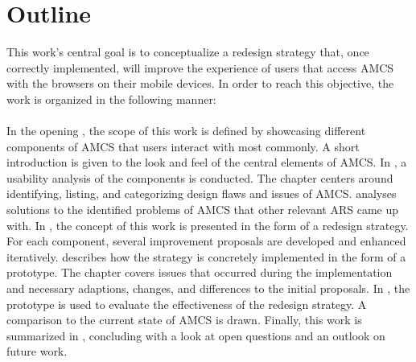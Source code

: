 \section{Outline}
\label{section:intro:objective}
This work's central goal is to conceptualize a redesign strategy that, once correctly implemented, will improve the experience of users that access AMCS with the browsers on their mobile devices. In order to reach this objective, the work is organized in the following manner:
\\
\\
In the opening , the scope of this work is defined by showcasing different components of AMCS that users interact with most commonly. A short introduction is given to the look and feel of the central elements of AMCS.
In , a usability analysis of the components is conducted. The chapter centers around identifying, listing, and categorizing design flaws and issues of AMCS. 
 analyses solutions to the identified problems of AMCS that other relevant ARS came up with.
In , the concept of this work is presented in the form of a redesign strategy. For each component, several improvement proposals are developed and enhanced iteratively. 
 describes how the strategy is concretely implemented in the form of a prototype. The chapter covers issues that occurred during the implementation and necessary adaptions, changes, and differences to the initial proposals.
In , the prototype is used to evaluate the effectiveness of the redesign strategy. A comparison to the current state of AMCS is drawn.
Finally, this work is summarized in , concluding with a look at open questions and an outlook on future work.